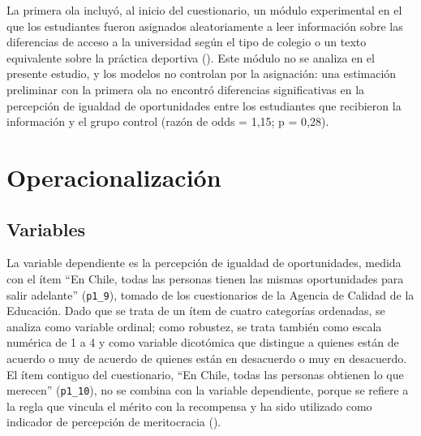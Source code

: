 \documentclass[
  spanish,
  a4paper,
  oneside]{scrbook}
\begin{document}
La primera ola incluyó, al inicio del cuestionario, un módulo
experimental en el que los estudiantes fueron asignados aleatoriamente a
leer información sobre las diferencias de acceso a la universidad según
el tipo de colegio o un texto equivalente sobre la práctica deportiva
(). Este módulo no se analiza en el presente estudio, y los modelos
no controlan por la asignación: una estimación preliminar con la primera
ola no encontró diferencias significativas en la percepción de igualdad
de oportunidades entre los estudiantes que recibieron la información y
el grupo control (razón de odds = 1,15; p = 0,28).

\section{Operacionalización}\label{operacionalizaciuxf3n}

\subsection{Variables}\label{variables}

La variable dependiente es la percepción de igualdad de oportunidades,
medida con el ítem ``En Chile, todas las personas tienen las mismas
oportunidades para salir adelante'' (\texttt{p1\_9}), tomado de los
cuestionarios de la Agencia de Calidad de la Educación. Dado que se
trata de un ítem de cuatro categorías ordenadas, se analiza como
variable ordinal; como robustez, se trata también como escala numérica
de 1 a 4 y como variable dicotómica que distingue a quienes están de
acuerdo o muy de acuerdo de quienes están en desacuerdo o muy en
desacuerdo. El ítem contiguo del cuestionario, ``En Chile, todas las
personas obtienen lo que merecen'' (\texttt{p1\_10}), no se combina con
la variable dependiente, porque se refiere a la regla que vincula el
mérito con la recompensa y ha sido utilizado como indicador de
percepción de meritocracia
().
\end{document}
